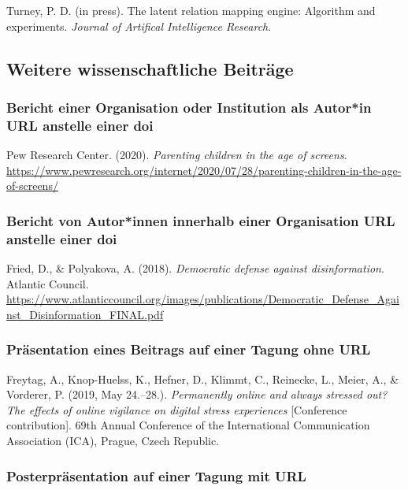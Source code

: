\documentclass[
  letterpaper,
  DIV=11]{scrreprt}
\begin{document}
Turney, P. D. (in press). The latent relation mapping engine: Algorithm
and experiments. \emph{Journal of Artifical Intelligence Research}.

\subsection{Weitere wissenschaftliche
Beiträge}\label{weitere-wissenschaftliche-beitruxe4ge}

\subsubsection{Bericht einer Organisation oder Institution als Autor*in
\textbar{} URL anstelle einer
doi}\label{bericht-einer-organisation-oder-institution-als-autorin-url-anstelle-einer-doi}

Pew Research Center. (2020). \emph{Parenting children in the age of
screens}.
\url{https://www.pewresearch.org/internet/2020/07/28/parenting-children-in-the-age-of-screens/}

\subsubsection{Bericht von Autor*innen innerhalb einer Organisation
\textbar{} URL anstelle einer
doi}\label{bericht-von-autorinnen-innerhalb-einer-organisation-url-anstelle-einer-doi}

Fried, D., \& Polyakova, A. (2018). \emph{Democratic defense against
disinformation}. Atlantic Council.
\url{https://www.atlanticcouncil.org/images/publications/Democratic_Defense_Against_Disinformation_FINAL.pdf}

\subsubsection{Präsentation eines Beitrags auf einer Tagung \textbar{}
ohne
URL}\label{pruxe4sentation-eines-beitrags-auf-einer-tagung-ohne-url}

Freytag, A., Knop-Huelss, K., Hefner, D., Klimmt, C., Reinecke, L.,
Meier, A., \& Vorderer, P. (2019, May 24.--28.). \emph{Permanently
online and always stressed out? The effects of online vigilance on
digital stress experiences} {[}Conference contribution{]}. 69th Annual
Conference of the International Communication Association (ICA), Prague,
Czech Republic.

\subsubsection{Posterpräsentation auf einer Tagung \textbar{} mit
URL}\label{posterpruxe4sentation-auf-einer-tagung-mit-url}
\end{document}
